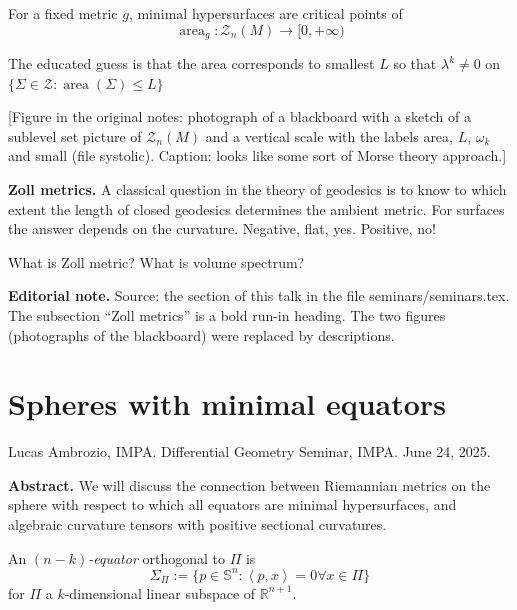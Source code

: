For a fixed metric $g$, minimal hypersurfaces
are critical points of
$$\operatorname{area}_g: \mathcal{Z}_n(M) \to
[0,+\infty)$$

The educated guess is that the area
corresponds to
smallest $L$ so that $\lambda^k \neq 0 $ on
$\{ \Sigma\in
\mathcal{Z}:\operatorname{area}(\Sigma)\leq
L\}$

[Figure in the original notes: photograph of
a blackboard with a sketch of a sublevel set
picture of $\mathcal{Z}_n(M)$ and a vertical
scale with the labels area, $L$, $\omega_k$
and small (file systolic). Caption: looks
like some sort of Morse theory approach.]

\medskip\noindent
{\bf Zoll metrics.}
A classical question in the theory of
geodesics is to know to which extent the
length of closed geodesics determines the
ambient metric. For surfaces the answer
depends on the curvature. Negative, flat,
yes. Positive, no!

\begin{remark}
\label{remark-neves-dani-question}
What is Zoll metric? What is volume spectrum?
\end{remark}

\medskip\noindent
{\bf Editorial note.}
Source: the section of this talk in the file
seminars/seminars.tex. The subsection ``Zoll
metrics'' is a bold run-in heading. The two
figures (photographs of the blackboard) were
replaced by descriptions.


\section{Spheres with minimal equators}
\label{section-spheres-with-minimal-equators}

\noindent
Lucas Ambrozio, IMPA.
Differential Geometry Seminar, IMPA.
June 24, 2025.

\medskip\noindent
{\bf Abstract.} We will discuss the
connection between Riemannian metrics on the
sphere with respect to which all equators are
minimal hypersurfaces, and
algebraic curvature tensors with positive
sectional curvatures.

\bigskip\noindent

\begin{definition}
\label{definition-equator}
An {\it $(n-k)$-equator} orthogonal to $\Pi$
is
$$
\Sigma_\Pi:=\{p\in\mathbb{S}^n:\left\langle{}p,
x\right\rangle{}=0\forall
x\in\Pi\}
$$
for $\Pi$ a $k$-dimensional linear subspace
of $\mathbb{R}^{n+1}$.
\end{definition}


